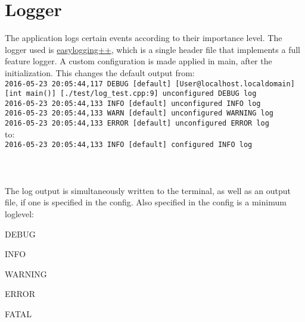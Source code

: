 

\section{Logger}
\label{sec:client_logger}

The application logs certain events according to their importance level.
The logger used is \href{https://github.com/easylogging/easyloggingpp/}{easylogging++}, which is a single header file that implements a full feature logger.
A custom configuration is made applied in main, after the initialization. This changes the default output from:\\
\texttt{2016-05-23 20:05:44,117 DEBUG [default] [User@localhost.localdomain] [int main()] [./test/log\_test.cpp:9] unconfigured DEBUG log}\\
\texttt{2016-05-23 20:05:44,133 INFO  [default] unconfigured INFO log}\\
\texttt{2016-05-23 20:05:44,133 WARN  [default] unconfigured WARNING log}\\
\texttt{2016-05-23 20:05:44,133 ERROR [default] unconfigured ERROR log}\\
to:\\
\texttt{2016-05-23 20:05:44,133 INFO  [default] configured INFO log}\\
\texttt{\color{orange}{2016-05-23 20:05:44,133 WARN  [default] configured WARNING log}}\\
\texttt{\color{red}{2016-05-23 20:05:44,133 ERROR [default] configured ERROR log}}\\
\texttt{\color{red}{2016-05-23 20:05:44,133 FATAL [default] configured FATAL log}}\\
The log output is simultaneously written to the terminal, as well as an output file, if one is specified in the config. Also specified in the config is a minimum loglevel:

\begin{shortlist}
	\item DEBUG
	\item INFO
	\item WARNING
	\item ERROR
	\item FATAL
\end{shortlist}
